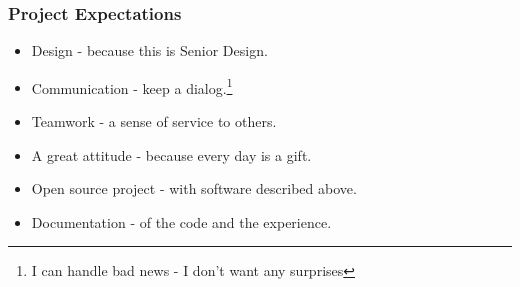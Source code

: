 \documentclass[xcolor=svgnames]{beamer}
\begin{document}
\begin{frame}[fragile]
  \frametitle{Project Expectations}

\begin{itemize}
\item Design - because this is Senior Design.
\item Communication - keep a dialog.\footnote{I can handle bad news - I don't want any surprises}
\item Teamwork - a sense of service to others.
\item A great attitude - because every day is a gift.
\item Open source project - with software described above.
\item Documentation - of the code and the experience.
\end{itemize}

\end{frame}
\end{document}
